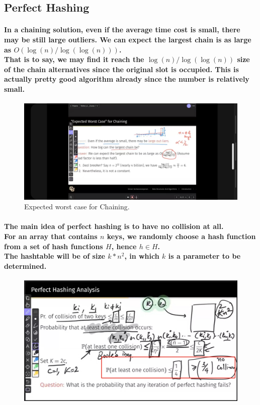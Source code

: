 \documentclass{article}
\begin{document}
\subsection{Perfect Hashing}

\paragraph{In a chaining solution, even if the average time cost is small, there may be still large 
outliers. We can expect the largest chain is as large as $O(\log(n)/\log(\log(n)))$.\\
That is to say, we may find it reach the $\log(n) / \log(\log(n))$ size of the chain alternatives 
since the original slot is occupied. This is actually pretty good algorithm already since the number 
is relatively small.\\}

\begin{figure}[H]
    \includegraphics[width=\textwidth]{expectedworstcaseforchaining.jpg}
    \caption{Expected worst case for Chaining.\\}
\end{figure}

\paragraph{The main idea of perfect hashing is to have no collision at all.\\
For an array that contains $n$ keys, we randomly choose a hash function from a 
set of hash functions $H$, hence $h \in H$.\\
The hashtable will be of size $k*n^2$, in which $k$ is a parameter to be determined.\\}

\begin{figure}[H]
    \includegraphics[width=\textwidth]{perfecthashinganalysis2.jpg}
\end{figure}
\end{document}
